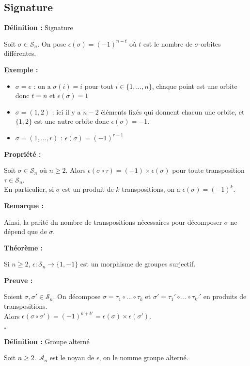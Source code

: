 \documentclass{report}
\renewenvironment{leftbar}{%
  \def\FrameCommand{\vrule width 0.4pt \hspace{10pt}}%
  \MakeFramed {\advance\hsize-\width \FrameRestore}}%
 {\endMakeFramed}%
\newenvironment{definition}[1][]{
    \begin{tcolorbox}[colframe= white]
    \textbf{Définition :} 
    #1 \par
    }
    {\end{tcolorbox}}
\newenvironment{preuve}{\vspace*{0.5cm}
    \begin{leftbar}
    \noindent\textbf{Preuve :}\par}{
    \begin{flushright}
    $\square$
    \end{flushright}
    \end{leftbar}
}
\newenvironment{prop}{\begin{tcolorbox}[colframe= white]
    \textbf{Propriété :}
     \par}
    {\end{tcolorbox}}
\newenvironment{exemple}{\begin{tcolorbox}[colback=gray!10,colframe= white]
    \textbf{Exemple :}
     \par}
    {\end{tcolorbox}}
\newenvironment{theoreme}[1][]{
    \begin{tcolorbox}[]
    \textbf{Théorème :} #1  \par} 
    {\end{tcolorbox}}
\newcommand{\remarque}{
    \noindent\textbf{Remarque :} \par
}
\newcommand{\sn}{\mathcal{S}_{n}}
\newcommand{\an}{\mathcal{A}_{n}}
\newcommand{\unn}{\{1, ..., n\}}
\newcommand{\sign}{\epsilon(\sigma)}
\begin{document}
\subsection{Signature}
\begin{definition}[Signature]
Soit $\sigma\in\sn$. On pose $\epsilon(\sigma)=(-1)^{n-t}$ où $t$ est le nombre de $\sigma$-orbites différentes.
\end{definition}

\begin{exemple}
\begin{itemize}[label=$\bullet$]
\item $\sigma=e$ : on a $\sigma(i)=i$ pour tout $i\in\unn$, chaque point est une orbite donc $t=n$ et $\sign=1$
\item $\sigma=(1,2)$ : ici il y a $n-2$ éléments fixés qui donnent chacun une orbite, et $\{1,2\}$ est une autre orbite donc $\sign=-1$.
\item $\sigma=(1,...,r)$ : $\sign=(-1)^{r-1}$
\end{itemize}
\end{exemple}

\begin{prop}
Soit $\sigma\in\sn$ où $n\geq2$. Alors $\epsilon(\sigma\circ\tau)=(-1)\times\sign$ pour toute transposition $\tau\in\sn$.\\
En particulier, si $\sigma$ est un produit de $k$ transpositions, on a $\sign=(-1)^k$.
\end{prop}

\remarque{Ainsi, la parité du nombre de transpositions nécessaires pour décomposer $\sigma$ ne dépend que de $\sigma$.}

\begin{theoreme}
Si $n\geq2$, $\epsilon:\sn\longrightarrow\{1,-1\}$ est un morphisme de groupes surjectif.
\end{theoreme}
\begin{preuve}
Soient $\sigma,\sigma'\in\sn$. On décompose $\sigma=\tau_1\circ...\circ\tau_k$ et $\sigma'=\tau_1'\circ...\circ\tau_{k'}'$ en produits de transpositions. \\Alors $\epsilon(\sigma\circ\sigma')=(-1)^{k+k'}=\sign\times\epsilon(\sigma')$.
\end{preuve}

\begin{definition}[Groupe alterné]
Soit $n\geq2$. $\an$ est le noyau de $\epsilon$, on le nomme groupe alterné.
\end{definition}

\par
\par
\end{document}
